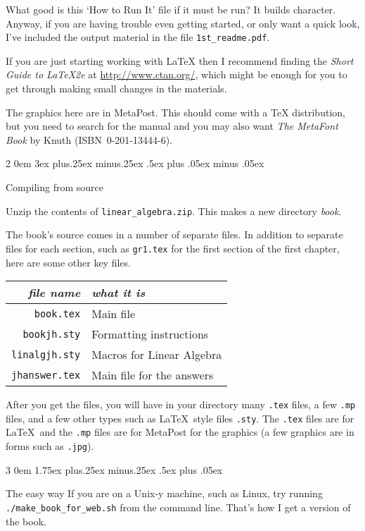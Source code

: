 \documentclass[titlepage]{article}
\makeatletter
\renewcommand{\subsection}{\@startsection{subsection}%
  {2}%
  {0em}%
  {3ex plus.25ex minus.25ex}%
  {.5ex plus .05ex minus .05ex}%
  {\bfseries\raggedright}}
\renewcommand{\subsubsection}{\@startsection{subsubsection}%
  {3}%
  {0em}%
  {1.75ex plus.25ex minus.25ex}%
  {.5ex plus .05ex}%
  {\bfseries\raggedright}}
\makeatother
\begin{document}
What good is this `How to Run It' file if it must be run?
It builds character.
Anyway, if you are having trouble even getting started, or only want a quick
look, I've included the output material in the file \texttt{1st\_readme.pdf}. 

If you are just starting working with \LaTeX{} then I recommend finding the 
\textit{Short Guide to \LaTeX2e} at
\url{http://www.ctan.org/}, which might be enough
for you to get through making small changes in the materials.

The graphics here are in MetaPost.
This should come with a \TeX{} distribution, but 
you need to search for the manual and you may also want 
\textit{The MetaFont Book} by Knuth
(ISBN~0-201-13444-6).





\subsection{Compiling from source}

Unzip the contents of \verb!linear_algebra.zip!.
This makes a new directory \textit{book}.

The book's source comes in a number of separate files.
In addition to separate files for each section, such as 
\texttt{gr1.tex} for the first section of the first chapter,
here are some other key files.
\begin{center}
  \begin{tabular}{r|l}
    \textit{file name}  &\textit{what it is}  \\
    \hline
    \texttt{book.tex}     &Main file \\
    \texttt{bookjh.sty}   &Formatting instructions  \\
    \texttt{linalgjh.sty} &Macros for Linear Algebra \\
    \texttt{jhanswer.tex} &Main file for the answers \\
  \end{tabular}
\end{center}

After you get the files, you will have in your
directory many \texttt{.tex} files, a few \texttt{.mp} files, and 
a few other types such as \LaTeX\ style files \texttt{.sty}.
The \texttt{.tex} files are for \LaTeX\ and the \texttt{.mp} files
are for MetaPost for the graphics
(a few graphics are in forms such as \texttt{.jpg}).


\subsubsection{The easy way}
If you are on a Unix-y machine, such as Linux, 
try running \verb!./make_book_for_web.sh! from the command line.
That's how I get a version of the book.
\end{document}
